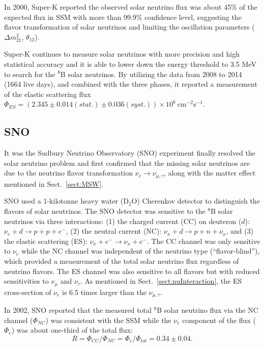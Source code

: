 In 2000, Super-K reported the observed solar neutrino flux was about 45\% of the expected flux in SSM with more than 99.9\% confidence level, suggesting the flavor transformation of solar neutrinos and limiting the oscillation parameters ($\Delta m^2_{21}$, $\theta_{12}$)\cite{superKwebsite}. 

Super-K continues to measure solar neutrinos with more precision and high statistical accuracy and it is able to lower down the energy threshold to 3.5 MeV to search for the $^8$B solar neutrinos. By utilizing the data from 2008 to 2014 (1664 live days),
and combined with the three phases, it reported a measurement of the elastic scattering flux $\Phi_{ES}=(2.345\pm0.014(stat.)\pm 0.036(syst.))\times 10^6~\mathrm{cm^{-2}s^{-1}}$\cite{abe2016solar}.

\subsection{SNO}
It was the Sudbury Neutrino Observatory (SNO) experiment finally resolved the solar neutrino problem and first confirmed that the missing solar neutrinos are due to the neutrino flavor transformation $\nu_e\to\nu_{\mu,\tau}$, along with the matter effect mentioned in Sect.~\ref{sect:MSW}. 

SNO used a 1-kilotonne heavy water (D$_2$O) Cherenkov detector to distinguish the flavors of solar neutrinos. The SNO detector was sensitive to the $^8$B solar neutrinos via three interactions: (1) the charged current (CC) on deuteron ($d$):
$\nu_e+d\to p+p+e^-$, (2) the neutral current (NC): $\nu_x+d\to p+n+\nu_x$, and (3) the elastic scattering (ES): $\nu_x+e^-\to \nu_x+e^-$. The CC channel was only sensitive to $\nu_e$ while the NC channel was independent of the neutrino type (``flavor-blind''), which provided a measurement of the total solar neutrino flux regardless of neutrino flavors. The ES channel was also sensitive to all flavors but with reduced sensitivities to $\nu_\mu$ and $\nu_\tau$\cite{ahmad2002direct}. As mentioned in Sect.~\ref{sect:nuInteraction}, the ES cross-section of $\nu_e$ is 6.5 times larger than the $\nu_{\mu,\tau}$. 

In 2002, SNO reported that the measured total $^8$B solar neutrino flux
via the NC channel ($\Phi_{NC}$) was consistent with the SSM while the $\nu_e$
component of the flux ($\Phi_e$) was about one-third of the total flux\cite{ahmad2002direct}:
\begin{equation}
R = \Phi_{CC}/\Phi_{NC} = \Phi_e/\Phi_{tot}=0.34\pm 0.04.
\end{equation}

